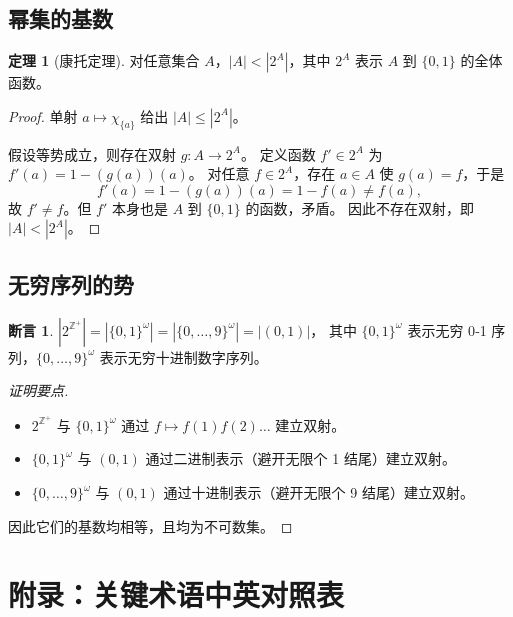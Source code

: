 \documentclass[UTF8,11pt,a4paper]{ctexbook}   %
\theoremstyle{definition}
\newtheorem{theorem}{定理}[section]
\newtheorem{proposition}{断言}[section]
\begin{document}
\subsection{幂集的基数}

\begin{theorem}[康托定理]
对任意集合 $A$，$|A| < |2^A|$，其中 $2^A$ 表示 $A$ 到 $\{0,1\}$ 的全体函数。
\end{theorem}

\begin{proof}
单射 $a\mapsto \chi_{\{a\}}$ 给出 $|A|\leq|2^A|$。

假设等势成立，则存在双射 $g:A\to 2^A$。
定义函数 $f'\in2^A$ 为 $f'(a)=1-(g(a))(a)$。
对任意 $f\in2^A$，存在 $a\in A$ 使 $g(a)=f$，于是
\[
f'(a) = 1-(g(a))(a) = 1-f(a) \neq f(a),
\]
故 $f'\neq f$。但 $f'$ 本身也是 $A$ 到 $\{0,1\}$ 的函数，矛盾。
因此不存在双射，即 $|A|<|2^A|$。
\end{proof}

\subsection{无穷序列的势}

\begin{proposition}
$|2^{\mathbb{Z}^+}| = |\{0,1\}^\omega| = |\{0,\dots,9\}^\omega| = |(0,1)|$，
其中 $\{0,1\}^\omega$ 表示无穷 0‑1 序列，$\{0,\dots,9\}^\omega$ 表示无穷十进制数字序列。
\end{proposition}

\begin{proof}[证明要点]
\begin{itemize}
    \item $2^{\mathbb{Z}^+}$ 与 $\{0,1\}^\omega$ 通过 $f\mapsto f(1)f(2)\dots$ 建立双射。
    \item $\{0,1\}^\omega$ 与 $(0,1)$ 通过二进制表示（避开无限个 1 结尾）建立双射。
    \item $\{0,\dots,9\}^\omega$ 与 $(0,1)$ 通过十进制表示（避开无限个 9 结尾）建立双射。
\end{itemize}
因此它们的基数均相等，且均为不可数集。
\end{proof}

\newpage
\section*{附录：关键术语中英对照表}
\end{document}
